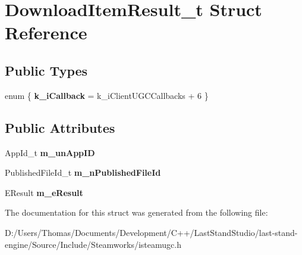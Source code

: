 \hypertarget{structDownloadItemResult__t}{}\section{Download\+Item\+Result\+\_\+t Struct Reference}
\label{structDownloadItemResult__t}
\subsection*{Public Types}
\begin{DoxyCompactItemize}
\item 
\hypertarget{structDownloadItemResult__t_a28b69dccd46cad07985bb4b20e528a83}{}enum \{ {\bfseries k\+\_\+i\+Callback} = k\+\_\+i\+Client\+U\+G\+C\+Callbacks + 6
 \}\label{structDownloadItemResult__t_a28b69dccd46cad07985bb4b20e528a83}

\end{DoxyCompactItemize}
\subsection*{Public Attributes}
\begin{DoxyCompactItemize}
\item 
\hypertarget{structDownloadItemResult__t_a2579da902b0caad9c264576d72b791c6}{}App\+Id\+\_\+t {\bfseries m\+\_\+un\+App\+I\+D}\label{structDownloadItemResult__t_a2579da902b0caad9c264576d72b791c6}

\item 
\hypertarget{structDownloadItemResult__t_a96e8c1bfe8718a06a629ab429b766528}{}Published\+File\+Id\+\_\+t {\bfseries m\+\_\+n\+Published\+File\+Id}\label{structDownloadItemResult__t_a96e8c1bfe8718a06a629ab429b766528}

\item 
\hypertarget{structDownloadItemResult__t_a03f32eabc4530ce700323483b11db6b7}{}E\+Result {\bfseries m\+\_\+e\+Result}\label{structDownloadItemResult__t_a03f32eabc4530ce700323483b11db6b7}

\end{DoxyCompactItemize}


The documentation for this struct was generated from the following file\+:\begin{DoxyCompactItemize}
\item 
D\+:/\+Users/\+Thomas/\+Documents/\+Development/\+C++/\+Last\+Stand\+Studio/last-\/stand-\/engine/\+Source/\+Include/\+Steamworks/isteamugc.\+h\end{DoxyCompactItemize}
